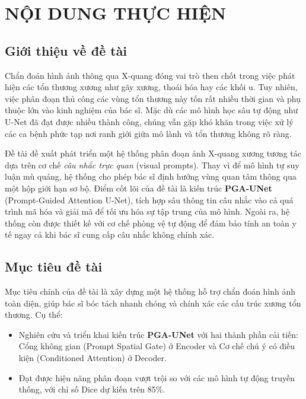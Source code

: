 \documentclass{article}[14pt]
\begin{document}
    \section{NỘI DUNG THỰC HIỆN}
    {

    \subsection{Giới thiệu về đề tài}
    
    Chẩn đoán hình ảnh thông qua X-quang đóng vai trò then chốt trong việc phát hiện các tổn thương xương như gãy xương, thoái hóa hay các khối u. Tuy nhiên, việc phân đoạn thủ công các vùng tổn thương này tốn rất nhiều thời gian và phụ thuộc lớn vào kinh nghiệm của bác sĩ. Mặc dù các mô hình học sâu tự động như U-Net đã đạt được nhiều thành công, chúng vẫn gặp khó khăn trong việc xử lý các ca bệnh phức tạp nơi ranh giới giữa mô lành và tổn thương không rõ ràng.
    
    Đề tài đề xuất phát triển một hệ thống phân đoạn ảnh X-quang xương tương tác dựa trên cơ chế \textit{câu nhắc trực quan} (visual prompts). Thay vì để mô hình tự suy luận mù quáng, hệ thống cho phép bác sĩ định hướng vùng quan tâm thông qua một hộp giới hạn sơ bộ. Điểm cốt lõi của đề tài là kiến trúc \textbf{PGA-UNet} (Prompt-Guided Attention U-Net), tích hợp sâu thông tin câu nhắc vào cả quá trình mã hóa và giải mã để tối ưu hóa sự tập trung của mô hình. Ngoài ra, hệ thống còn được thiết kế với cơ chế phòng vệ tự động để đảm bảo tính an toàn y tế ngay cả khi bác sĩ cung cấp câu nhắc không chính xác.

    \subsection{Mục tiêu đề tài}
    
    Mục tiêu chính của đề tài là xây dựng một hệ thống hỗ trợ chẩn đoán hình ảnh toàn diện, giúp bác sĩ bóc tách nhanh chóng và chính xác các cấu trúc xương tổn thương. Cụ thể:
    \begin{itemize}
        \item Nghiên cứu và triển khai kiến trúc \textbf{PGA-UNet} với hai thành phần cải tiến: Cổng không gian (Prompt Spatial Gate) ở Encoder và Cơ chế chú ý có điều kiện (Conditioned Attention) ở Decoder.
        \item Đạt được hiệu năng phân đoạn vượt trội so với các mô hình tự động truyền thống, với chỉ số Dice dự kiến trên 85\%.
    \end{itemize}
    
}
\end{document}
